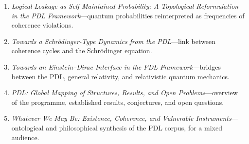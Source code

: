 \documentclass[12pt, a4paper, openright]{book}
\begin{document}
\begin{enumerate}
\item \textit{Logical Leakage as Self-Maintained Probability: A Topological Reformulation in the PDL Framework}---quantum probabilities reinterpreted as frequencies of coherence violations.

\item \textit{Towards a Schrödinger-Type Dynamics from the PDL}---link between coherence cycles and the Schrödinger equation.

\item \textit{Towards an Einstein--Dirac Interface in the PDL Framework}---bridges between the PDL, general relativity, and relativistic quantum mechanics.

\item \textit{PDL: Global Mapping of Structures, Results, and Open Problems}---overview of the programme, established results, conjectures, and open questions.

\item \textit{Whatever We May Be: Existence, Coherence, and Vulnerable Instruments}---ontological and philosophical synthesis of the PDL corpus, for a mixed audience.

\end{enumerate}

\end{document}
